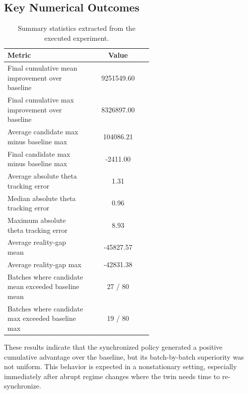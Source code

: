 \documentclass[11pt]{article}
\begin{document}
\subsection{Key Numerical Outcomes}
\begin{table}[H]
\centering
\begin{tabular}{>{\raggedright\arraybackslash}p{0.58\linewidth}S}
\toprule
Metric & {Value} \\
\midrule
Final cumulative mean improvement over baseline & 9251549.60 \\
Final cumulative max improvement over baseline & 8326897.00 \\
Average candidate max minus baseline max & 104086.21 \\
Final candidate max minus baseline max & -2411.00 \\
Average absolute theta tracking error & 1.31 \\
Median absolute theta tracking error & 0.96 \\
Maximum absolute theta tracking error & 8.93 \\
Average reality-gap mean & -45827.57 \\
Average reality-gap max & -42831.38 \\
Batches where candidate mean exceeded baseline mean & 27 / 80 \\
Batches where candidate max exceeded baseline max & 19 / 80 \\
\bottomrule
\end{tabular}
\caption{Summary statistics extracted from the executed experiment.}
\end{table}

These results indicate that the synchronized policy generated a positive cumulative advantage over the baseline, but its batch-by-batch superiority was not uniform. This behavior is expected in a nonstationary setting, especially immediately after abrupt regime changes where the twin needs time to re-synchronize.
\end{document}
